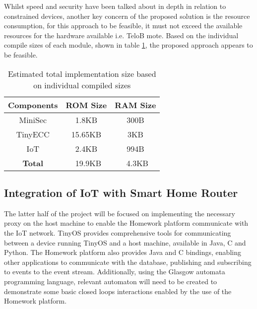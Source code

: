\documentclass{mprop}
\begin{document}
Whilst speed and security have been talked about in depth in relation to constrained devices, another key concern of the proposed solution is the resource consumption, for this approach to be feasible, it must not exceed the available resources for the hardware available i.e. TeloB mote. Based on the individual compile sizes of each module, shown in table \ref{tab:compile_sizes}, the proposed approach appears to be feasible.
\begin{table}[h] %
  \begin{center} 
  \begin{tabular}{|c|c|c|} 
  \hline
  \textbf{Components} & \textbf{ROM Size}  & \textbf{RAM Size}\\  \hline
  MiniSec             & 1.8KB              & 300B \\     \hline
  TinyECC             & 15.65KB            & 3KB\\       \hline
  IoT                 & 2.4KB              & 994B\\      \hline 
  \textbf{Total}      & ~19.9KB            & ~4.3KB\\    \hline
  \end{tabular}
  \caption[]{Estimated total implementation size based on individual compiled sizes}
  \label{tab:compile_sizes}
  \end{center}
\end{table}


\subsection{Integration of IoT with Smart Home Router} %
\label{sub:implementation_of_iot_on_smart_home_router}
The latter half of the project will be focused on implementing the necessary proxy on the host machine to enable the Homework platform communicate with the IoT network. TinyOS provides comprehensive tools for communicating between a device running TinyOS and a host machine, available in Java, C and Python. The Homework platform also provides Java and C bindings, enabling other applications to communicate with the database, publishing and subscribing to events to the event stream. Additionally, using the Glasgow automata programming language, relevant automaton will need to be created to demonstrate some basic closed loops interactions enabled by the use of the Homework platform.
\end{document}
